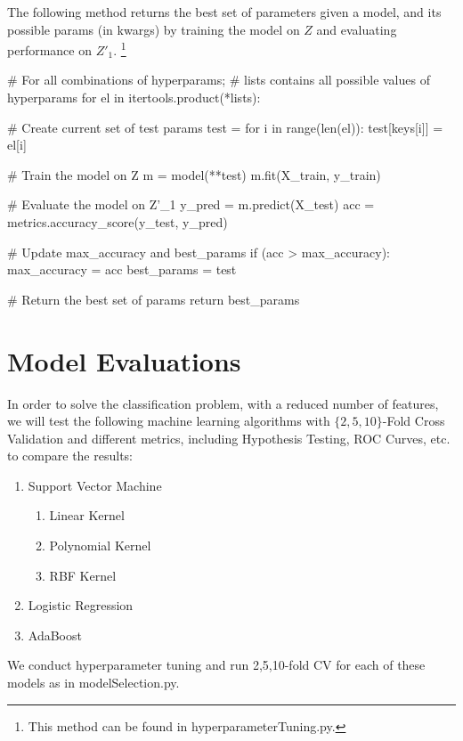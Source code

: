 \documentclass[fleqn]{article}
\begin{document}
    The following method returns the best set of parameters given a model, and its possible
    params (in kwargs) by training the model on $ Z $ and evaluating performance on $ Z'_1 $.
    \footnote{This method can be found in hyperparameterTuning.py.}
    \begin{python}
    # For all combinations of hyperparams;
    # lists contains all possible values of hyperparams
    for el in itertools.product(*lists):

        # Create current set of test params
        test = {}
        for i in range(len(el)):
            test[keys[i]] = el[i]

        # Train the model on Z
        m = model(**test)
        m.fit(X_train, y_train)

        # Evaluate the model on Z'_1
        y_pred = m.predict(X_test)
        acc = metrics.accuracy_score(y_test, y_pred)

        # Update max_accuracy and best_params
        if (acc > max_accuracy):
            max_accuracy = acc
            best_params = test

    # Return the best set of params
    return best_params
    \end{python}

    \section{Model Evaluations}
    In order to solve the classification problem, with a reduced number of features,
    we will test the following machine learning algorithms with $ \{2, 5, 10\} $-Fold Cross
    Validation and different metrics, including Hypothesis Testing, ROC Curves, etc.
    to compare the results:
    \begin{enumerate}
        \item Support Vector Machine
        \begin{enumerate}
            \item Linear Kernel
            \item Polynomial Kernel
            \item RBF Kernel
        \end{enumerate}
        \item Logistic Regression
        \item AdaBoost
    \end{enumerate}
    We conduct hyperparameter tuning and run 2,5,10-fold CV for each of these models as
    in modelSelection.py.
\end{document}
